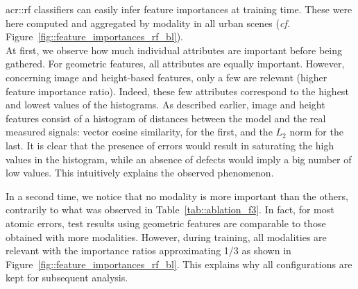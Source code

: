         \gls{acr::rf} classifiers can easily infer feature importances at training time.
        These were here computed and aggregated by modality in all urban scenes (\textit{cf.} Figure~\ref{fig::feature_importances_rf_bl}).\\

        At first, we observe how much individual attributes are important before being gathered.
        For geometric features, all attributes are equally important.
        However, concerning image and height-based features, only a few are relevant (higher feature importance ratio).
        Indeed, these few attributes correspond to the highest and lowest values of the histograms.
        As described earlier, image and height features consist of a histogram of distances between the model and the real measured signals:
        vector cosine similarity, for the first, and the \(L_2\) norm for the last.
        It is clear that the presence of errors would result in saturating the high values in the histogram, while an absence of defects would imply a big number of low values.
        This intuitively explains the observed phenomenon.
        
        In a second time, we notice that no modality is more important than the others, contrarily to what was observed in Table~\ref{tab::ablation_f3}.
        In fact, for most atomic errors, test results using geometric features are comparable to those obtained with more modalities.
        However, during training, all modalities are relevant with the importance ratios approximating 1/3 as shown in Figure~\ref{fig::feature_importances_rf_bl}.
        This explains why all configurations are kept for subsequent analysis.
